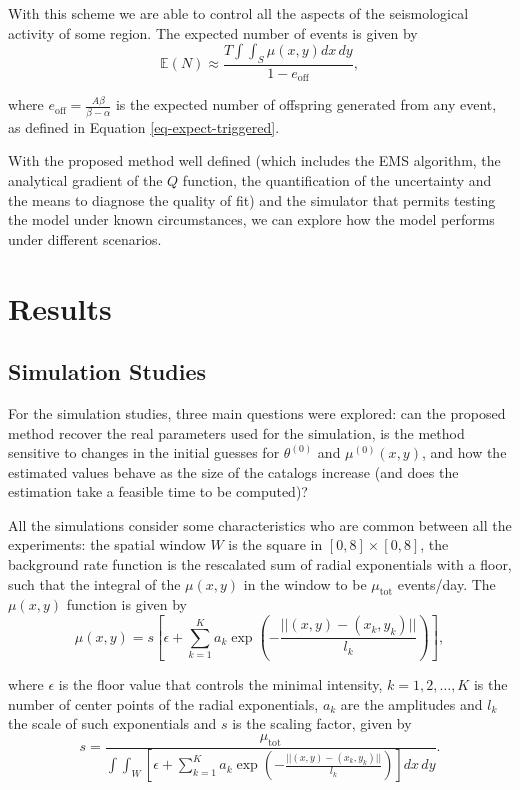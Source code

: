 With this scheme we are able to control all the aspects of the seismological activity of some region. The expected number of events is given by
\begin{equation*}
  \mathds{E}(N) \approx \frac{T \int \int_{S}\mu(x,y)dx\, dy}{1 - e_{\mathrm{off}}},
\end{equation*}

\noindent where $e_{\mathrm{off}} = \frac{A\beta}{\beta - \alpha}$ is the expected number of offspring generated from any event, as defined in Equation \eqref{eq-expect-triggered}.

With the proposed method well defined (which includes the EMS algorithm, the analytical gradient of the $Q$ function, the quantification of the uncertainty and the means to diagnose the quality of fit) and the simulator that permits testing the model under known circumstances, we can explore how the model performs under different scenarios.

\part{Results}
\label{part-results}

\chapter{Simulation Studies}
\label{chap-simulation-studies}

For the simulation studies, three main questions were explored: can the proposed method recover the real parameters used for the simulation, is the method sensitive to changes in the initial guesses for $\theta^{(0)}$ and $\mu^{(0)}(x,y)$, and how the estimated values behave as the size of the catalogs increase (and does the estimation take a feasible time to be computed)?

All the simulations consider some characteristics who are common between all the experiments: the spatial window $W$ is the square in $[0,8] \times [0,8]$, the background rate function is the rescalated sum of radial exponentials with a floor, such that the integral of the $\mu(x,y)$ in the window to be $\mu_{\mathrm{tot}}$ events/day. The $\mu(x,y)$ function is given by
\begin{equation}
  \label{eq-mu-simulado}
  \mu(x,y) = s\left[\epsilon + \sum_{k = 1}^{K}a_{k}\exp\left(- \frac{||(x,y) - (x_{k},y_{k})||}{l_{k}}\right)\right],
\end{equation}

\noindent where $\epsilon$ is the floor value that controls the minimal intensity, $k = 1,2,\ldots,K$ is the number of center points of the radial exponentials, $a_{k}$ are the amplitudes and $l_{k}$ the scale of such exponentials and $s$ is the scaling factor, given by
\begin{equation*}
  s = \frac{\mu_{\mathrm{tot}}}{\int\int_{W}\left[\epsilon + \sum_{k = 1}^{K}a_{k}\exp\left(- \frac{||(x,y) - (x_{k},y_{k})||}{l_{k}}\right)\right]dx\, dy}.
\end{equation*}

